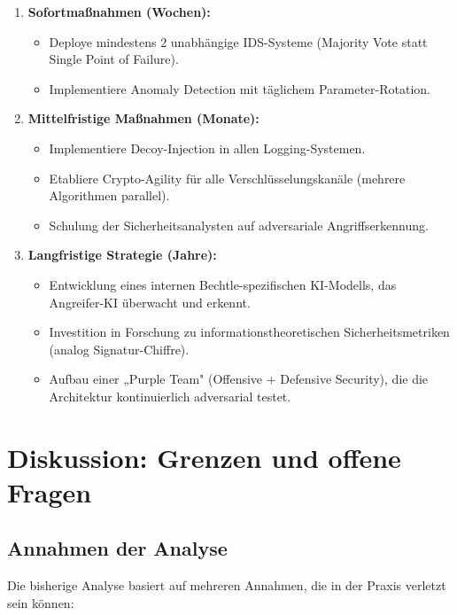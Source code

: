 \documentclass[a4paper,12pt]{article}
\theoremstyle{definition}
\begin{document}
\begin{enumerate}
	\item \textbf{Sofortmaßnahmen (Wochen):}
	\begin{itemize}
		\item Deploye mindestens 2 unabhängige IDS-Systeme (Majority Vote statt Single Point of Failure).
		\item Implementiere Anomaly Detection mit täglichem Parameter-Rotation.
	\end{itemize}
	
	\item \textbf{Mittelfristige Maßnahmen (Monate):}
	\begin{itemize}
		\item Implementiere Decoy-Injection in allen Logging-Systemen.
		\item Etabliere Crypto-Agility für alle Verschlüsselungskanäle (mehrere Algorithmen parallel).
		\item Schulung der Sicherheitsanalysten auf adversariale Angriffserkennung.
	\end{itemize}
	
	\item \textbf{Langfristige Strategie (Jahre):}
	\begin{itemize}
		\item Entwicklung eines internen Bechtle-spezifischen KI-Modells, das Angreifer-KI überwacht und erkennt.
		\item Investition in Forschung zu informationstheoretischen Sicherheitsmetriken (analog Signatur-Chiffre).
		\item Aufbau einer „Purple Team" (Offensive + Defensive Security), die die Architektur kontinuierlich adversarial testet.
	\end{itemize}
\end{enumerate}

\section{Diskussion: Grenzen und offene Fragen}

\subsection{Annahmen der Analyse}

Die bisherige Analyse basiert auf mehreren Annahmen, die in der Praxis verletzt sein können:
\end{document}
